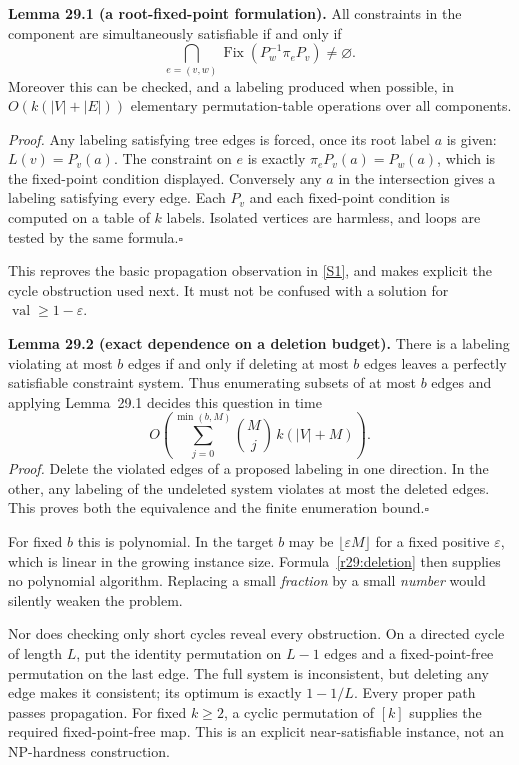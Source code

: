 \documentclass[11pt,a4paper]{article}
\newcommand{\sref}[2]{\hyperlink{source:#1:#2}{[S#2]}}
\numberwithin{equation}{section}
\begin{document}
\textbf{Lemma 29.1 (a root-fixed-point formulation).}
All constraints in the component are simultaneously satisfiable if and
only if
\begin{equation}\label{r29:holonomy}
 \bigcap_{e=(v,w)}\operatorname{Fix}(P_w^{-1}\pi_eP_v)
                       \ne\varnothing.
\end{equation}
Moreover this can be checked, and a labeling produced when possible, in
$O(k(|V|+|E|))$ elementary permutation-table operations over all components.

\emph{Proof.} Any labeling satisfying tree edges is forced, once its root
label $a$ is given: $L(v)=P_v(a)$. The constraint on $e$ is exactly
$\pi_eP_v(a)=P_w(a)$, which is the fixed-point condition displayed.
Conversely any $a$ in the intersection gives a labeling satisfying every
edge. Each $P_v$ and each fixed-point condition is computed on a table
of $k$ labels. Isolated vertices are harmless, and loops are tested by
the same formula.\hfill$\square$

This reproves the basic propagation observation in \sref{statement}{1}, and
makes explicit the cycle obstruction used next. It must not be confused
with a solution for $\operatorname{val}\ge1-\varepsilon$.

\textbf{Lemma 29.2 (exact dependence on a deletion budget).}
There is a labeling violating at most $b$ edges if and only if deleting
at most $b$ edges leaves a perfectly satisfiable constraint system.
Thus enumerating subsets of at most $b$ edges and applying
Lemma~29.1 decides this question in time
\begin{equation}\label{r29:deletion}
       O\!\left(\sum_{j=0}^{\min(b,M)}\binom Mj\,k(|V|+M)\right).
\end{equation}
\emph{Proof.} Delete the violated edges of a proposed labeling in one
direction. In the other, any labeling of the undeleted system violates
at most the deleted edges. This proves both the equivalence and the
finite enumeration bound.\hfill$\square$

For fixed $b$ this is polynomial. In the target $b$ may be
$\lfloor\varepsilon M\rfloor$ for a fixed positive $\varepsilon$, which
is linear in the growing instance size. Formula~\eqref{r29:deletion}
then supplies no polynomial algorithm. Replacing a small \emph{fraction}
by a small \emph{number} would silently weaken the problem.

Nor does checking only short cycles reveal every obstruction. On a
directed cycle of length $L$, put the identity permutation on $L-1$
edges and a fixed-point-free permutation on the last edge. The full
system is inconsistent, but deleting any edge makes it consistent;
its optimum is exactly $1-1/L$. Every proper path passes propagation.
For fixed $k\ge2$, a cyclic permutation of $[k]$ supplies the required
fixed-point-free map. This is an explicit near-satisfiable instance, not
an NP-hardness construction.
\end{document}
